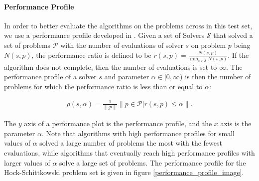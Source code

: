 \paragraph*{Performance Profile}
\label{performance_profile}
In order to better evaluate the algorithms on the problems across in this test set, we use a performance profile developed in \cite{More:2009:BDO:1654367.1654371}.
Given a set of Solvers $\mathcal S$ that solved a set of problems $\mathcal P$ with the number of evaluations of solver $s$ on problem $p$ being $N(s, p)$, the performance ratio is defined to be $r(s, p) = \frac{N(s, p)}{\min_{s \in \mathcal S} N(s, p)}$.
If the algorithm does not complete, then the number of evaluations is set to $\infty$.
The performance profile of a solver $s$ and parameter $\alpha \in [0, \infty)$ is then the number of problems for which the performance ratio is less than or equal to $\alpha$: 

\begin{align}
\rho(s, \alpha) = \frac 1 {\left\|\mathcal P \right\|} \left\|p \in \mathcal P | r(s, p) \le \alpha\right\|.
\end{align}

The $y$ axis of a performance plot is the performance profile, and the $x$ axis is the parameter $\alpha$.
Note that algorithms with high performance profiles for small values of $\alpha$ solved a large number of problems the most with the fewest evaluations, while algorithms that eventually reach high performance profiles with larger values of $\alpha$ solve a large set of problems.
The performance profile for the Hock-Schittkowski problem set is given in figure \cref{performance_profile_image}.


